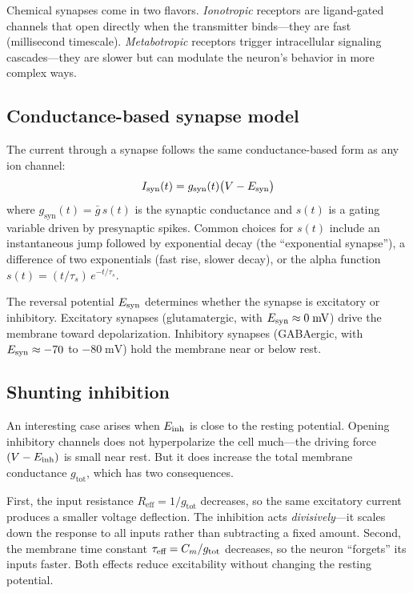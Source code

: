Chemical synapses come in two flavors. \emph{Ionotropic} receptors are ligand-gated channels that open directly when the transmitter binds---they are fast (millisecond timescale). \emph{Metabotropic} receptors trigger intracellular signaling cascades---they are slower but can modulate the neuron's behavior in more complex ways.

\subsection{Conductance-based synapse model}

The current through a synapse follows the same conductance-based form as any ion channel:
%
\begin{equation}
  I_{\text{syn}}(t) = g_{\text{syn}}(t)\bigl(V - E_{\mathrm{\text{syn}}}\bigr)
  \label{eq:synapse-current}
\end{equation}
%
where $g_{\text{syn}}(t) = \bar{g}\,s(t)$ is the synaptic conductance and $s(t)$ is a gating variable driven by presynaptic spikes. Common choices for $s(t)$ include an instantaneous jump followed by exponential decay (the ``exponential synapse''), a difference of two exponentials (fast rise, slower decay), or the alpha function $s(t) = (t/\tau_s)\,e^{-t/\tau_s}$.

The reversal potential $E_{\mathrm{\text{syn}}}$ determines whether the synapse is excitatory or inhibitory. Excitatory synapses (glutamatergic, with $E_{\mathrm{\text{syn}}} \approx 0\;\text{mV}$) drive the membrane toward depolarization. Inhibitory synapses (GABAergic, with $E_{\mathrm{\text{syn}}} \approx -70$ to $-80\;\text{mV}$) hold the membrane near or below rest.

\subsection{Shunting inhibition}
\label{sec:shunting}

An interesting case arises when $E_{\mathrm{\text{inh}}}$ is close to the resting potential. Opening inhibitory channels does not hyperpolarize the cell much---the driving force $(V - E_{\mathrm{\text{inh}}})$ is small near rest. But it does increase the total membrane conductance $g_{\text{tot}}$, which has two consequences.

First, the input resistance $R_{\text{eff}} = 1/g_{\text{tot}}$ decreases, so the same excitatory current produces a smaller voltage deflection. The inhibition acts \emph{divisively}---it scales down the response to all inputs rather than subtracting a fixed amount. Second, the membrane time constant $\tau_{\text{eff}} = C_m/g_{\text{tot}}$ decreases, so the neuron ``forgets'' its inputs faster. Both effects reduce excitability without changing the resting potential.

